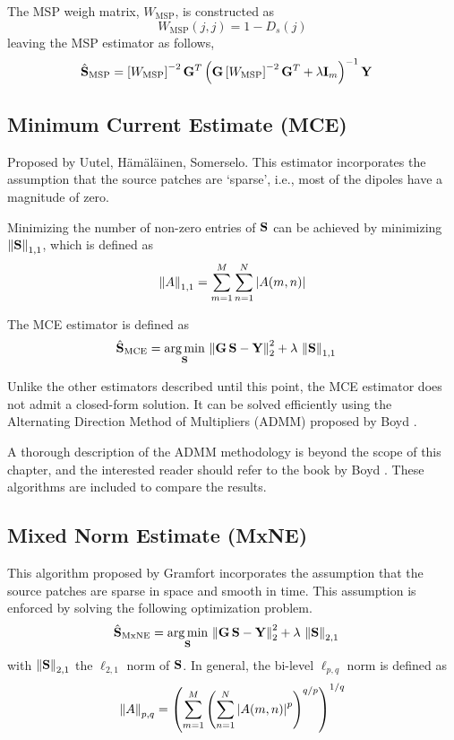 The MSP weigh matrix, $W_\text{MSP}$, is constructed as
\begin{equation}
W_\text{MSP}(j,j) = 1-{D}_s(j)
\end{equation}
leaving the MSP estimator as follows,
\begin{align}
\hat{\mathbf{S}}_\text{MSP} &=
\left[ W_\text{MSP} \right]^{-2} \mathbf{G}^T \left(  \mathbf{G}\left[ W_\text{MSP} \right]^{-2}\mathbf{G}^T + \lambda \mathbf{I}_m   \right)^{-1} \mathbf{Y}
\label{est:MSP}
\end{align}

\subsection{Minimum Current Estimate (MCE)}

Proposed by Uutel, H\"{a}m\"{a}l\"{a}inen, Somerselo.
%
This estimator incorporates the assumption that the source patches are `sparse', i.e., most of the dipoles have a magnitude of zero.

Minimizing the number of non-zero entries of $\mathbf{S}$ can be achieved by minimizing $\left\lVert \mathbf{S} \right\rVert_{1,1}$, which is defined as
\begin{equation}
\left\lVert A \right\rVert_{1,1} = \sum_{m=1}^M \sum_{n=1}^N \left| {A(m,n)} \right|
\end{equation}

The MCE estimator is defined as
\begin{align}
\hat{\mathbf{S}}_\text{MCE} &=
\operatorname*{arg\,min}_{\mathbf{S}}\, \left\lVert \mathbf{G}\, \mathbf{S} - \mathbf{Y}  \right\rVert_2^2 + \lambda\, \left\lVert \mathbf{S} \right\rVert_{1,1}
\label{est:MCE}
\end{align}

Unlike the other estimators described until this point, the MCE estimator does not admit a closed-form solution.
%
It can be solved efficiently using the Alternating Direction Method of Multipliers (ADMM) proposed by Boyd \cite{boyd2011admm}.

A thorough description of the ADMM methodology is beyond the scope of this chapter, and the interested reader should refer to the book by Boyd \cite{boyd2011admm}.
%
These algorithms are included to compare the results.

\subsection{Mixed Norm Estimate (MxNE)}

This algorithm proposed by Gramfort incorporates the assumption that the source patches are sparse in space and smooth in time.
%
This assumption is enforced by solving the following optimization problem.
\begin{align}
\hat{\mathbf{S}}_\text{MxNE} &=
\operatorname*{arg\,min}_{\mathbf{S}}\, \left\lVert \mathbf{G}\, \mathbf{S} - \mathbf{Y}  \right\rVert_2^2 + \lambda\, \left\lVert \mathbf{S} \right\rVert_{2,1}
\label{est:MxNE}
\end{align}
with $\left\lVert \mathbf{S} \right\rVert_{2,1}$ the $\ell_{2,1}$ norm of $\mathbf{S}$.
%
In general, the bi-level $\ell_{p,q}$ norm is defined as
\begin{equation}
\left\lVert A \right\rVert_{p,q} =
\left( \sum_{m=1}^M \left(  \sum_{n=1}^N \left| {A(m,n)} \right|^p  \right)^{q/p} \right)^{1/q}
\end{equation}

